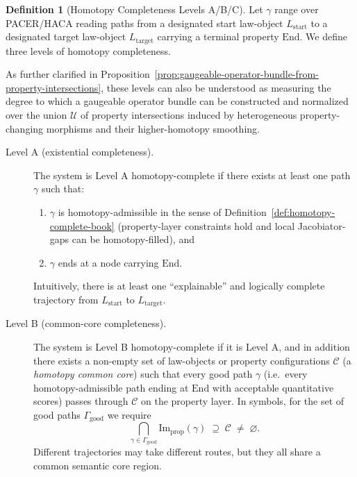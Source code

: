 \documentclass[11pt]{book}
\theoremstyle{plain}
\theoremstyle{definition}
\newtheorem{definition}[theorem]{Definition}
\theoremstyle{remark}
\begin{document}
\begin{definition}[Homotopy Completeness Levels A/B/C]
\label{def:homotopy-completeness-levels}
Let $\gamma$ range over PACER/HACA reading paths from a designated start
law-object $L_{\mathrm{start}}$ to a designated target law-object
$L_{\mathrm{target}}$ carrying a terminal property $\mathrm{End}$. We
define three levels of homotopy completeness.

As further clarified in
Proposition~\ref{prop:gaugeable-operator-bundle-from-property-intersections},
these levels can also be understood as measuring the degree to which a
gaugeable operator bundle can be constructed and normalized over the union
$\mathcal{U}$ of property intersections induced by heterogeneous
property-changing morphisms and their higher-homotopy smoothing.

\begin{description}
  \item[Level A (existential completeness).]
    The system is Level A homotopy-complete if there exists at least one
    path $\gamma$ such that:
    \begin{enumerate}
      \item $\gamma$ is homotopy-admissible in the sense of
            Definition~\ref{def:homotopy-complete-book}
            (property-layer constraints hold and local Jacobiator-gaps can
            be homotopy-filled), and
      \item $\gamma$ ends at a node carrying $\mathrm{End}$.
    \end{enumerate}
    Intuitively, there is at least one ``explainable'' and logically
    complete trajectory from $L_{\mathrm{start}}$ to $L_{\mathrm{target}}$.

  \item[Level B (common-core completeness).]
    The system is Level B homotopy-complete if it is Level A, and in
    addition there exists a non-empty set of law-objects or property
    configurations $\mathcal{C}$ (a \emph{homotopy common core}) such that
    every good path $\gamma$ (i.e.\ every homotopy-admissible path ending
    at $\mathrm{End}$ with acceptable quantitative scores) passes through
    $\mathcal{C}$ on the property layer. In symbols, for the set of good
    paths $\Gamma_{\mathrm{good}}$ we require
    \[
      \bigcap_{\gamma \in \Gamma_{\mathrm{good}}}
      \mathrm{Im}_{\mathrm{prop}}(\gamma)
      \;\supseteq\;
      \mathcal{C}
      \;\neq\;\varnothing.
    \]
    Different trajectories may take different routes, but they all share a
    common semantic core region.


\end{description}
\end{definition}
\end{document}
